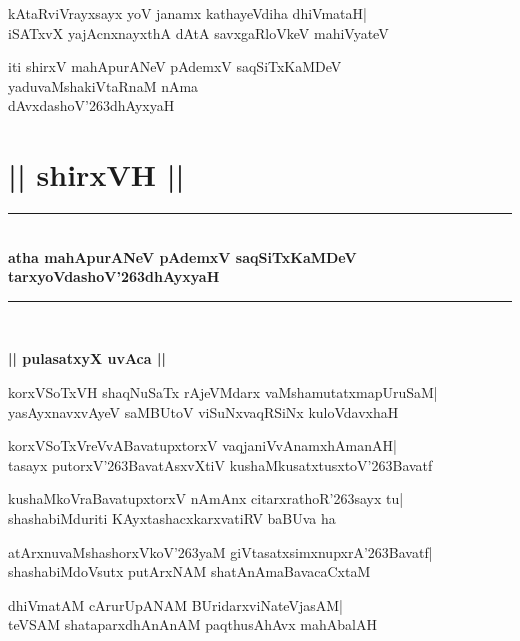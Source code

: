 \documentclass[twoside,12pt,openright]{book}
\def\S{\char'263}
\newcounter{shloka}[chapter]
\def\uvaca#1{\centerline{{\large\textbf{#1}}}}
\begin{document}
\begin{shloka}%
kAtaRviVrayxsayx yoV janamx kathayeVdiha dhiVmataH|\\
iSATxvX yajAcnxnayxthA dAtA savxgaRloVkeV mahiVyateV
\end{shloka}

\begin{center}
 iti shirxV mahApurANeV pAdemxV saqSiTxKaMDeV\\
 yaduvaMshakiVtaRnaM nAma\\
 dAvxdashoV\S dhAyxyaH
\end{center}

\chapter{|| shirxVH ||}
\begin{center}
\rule{2cm}{1pt}\\[0.5cm]
{\LARGE\bfseries atha mahApurANeV pAdemxV saqSiTxKaMDeV}\\[.3cm]
{\LARGE\bfseries tarxyoVdashoV\S dhAyxyaH}\\[.3cm]
\rule{2cm}{1pt}\\
\end{center}

\uvaca{|| pulasatxyX uvAca ||}
\begin{shloka}%
korxVSoTxVH shaqNuSaTx rAjeVMdarx vaMshamutatxmapUruSaM|\\
yasAyxnavxvAyeV saMBUtoV viSuNxvaqRSiNx kuloVdavxhaH
\end{shloka}

\begin{shloka}%
korxVSoTxVreVvABavatupxtorxV vaqjaniVvAnamxhAmanAH|\\
tasayx putorxV\S BavatAsxvXtiV kushaMkusatxtusxtoV\S Bavatf
\end{shloka}

\begin{shloka}%
kushaMkoVraBavatupxtorxV nAmAnx citarxrathoR\S sayx tu|\\
shashabiMduriti KAyxtashacxkarxvatiRV baBUva ha
\end{shloka}

\begin{shloka}%
atArxnuvaMshashorxVkoV\S yaM giVtasatxsimxnupxrA\S Bavatf|\\
shashabiMdoVsutx putArxNAM shatAnAmaBavacaCxtaM
\end{shloka}

\begin{shloka}%
dhiVmatAM cArurUpANAM BUridarxviNateVjasAM|\\
teVSAM shataparxdhAnAnAM paqthusAhAvx mahAbalAH
\end{shloka}
\end{document}

